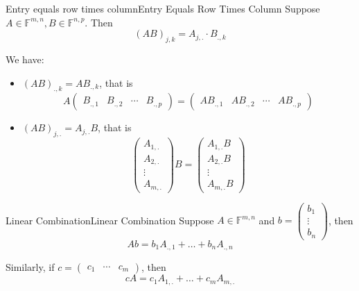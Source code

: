 \documentclass[../main.tex]{subfiles}
\begin{document}
\begin{theorem}{Entry equals row times column}{Entry Equals Row Times Column}
Suppose $A\in \mathbb{F}^{m,n},B\in \mathbb{F}^{n,p}$. Then
\begin{equation*}
	(AB)_{j,k} = A_{j,.} \cdot B_{.,k}
\end{equation*}
\end{theorem}
\begin{example}{}{}
We have:
\begin{itemize}
\item $(AB)_{.,k} = AB_{.,k}$, that is
	\begin{equation*}
	A
	\begin{pmatrix}
		B_{.,1} & B_{.,2} & \cdots & B_{.,p}
	\end{pmatrix}
	=
	\begin{pmatrix}
		AB_{.,1} & AB_{.,2} & \cdots & AB_{.,p}
	\end{pmatrix}
	\end{equation*}
\item $(AB)_{j,.} = A_{j,.}B$, that is
	\begin{equation*}
	\begin{pmatrix}
	A_{1,.}\\A_{2,.}\\\vdots \\A_{m,.}
	\end{pmatrix}
	B
	=
	\begin{pmatrix}
	A_{1,.}B\\A_{2,.}B\\\vdots \\A_{m,.}B
	\end{pmatrix}
	\end{equation*}
\end{itemize}
\end{example}

\begin{theorem}{Linear Combination}{Linear Combination}
Suppose $A\in \mathbb{F}^{m,n}$ and $\displaystyle b= 
\begin{pmatrix}
b_1\\\vdots \\b_n
\end{pmatrix}
$, then
\begin{equation*}
Ab = b_1A_{.,1}+\ldots +b_nA_{.,n}
\end{equation*}

Similarly, if $c = 
\begin{pmatrix}
	c_1&\cdots &c_m
\end{pmatrix}
$, then
\begin{equation*}
cA = c_1A_{1,.}+\ldots +c_mA_{m,.}
\end{equation*}
\end{theorem}
\end{document}
